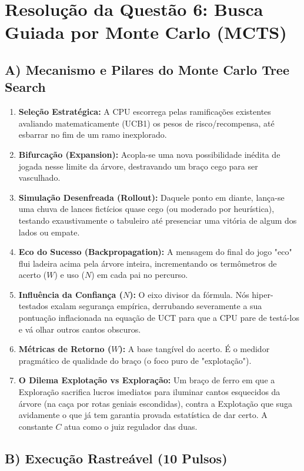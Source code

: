 \section*{Resolução da Questão 6: Busca Guiada por Monte Carlo (MCTS)}

\subsection*{A) Mecanismo e Pilares do Monte Carlo Tree Search}

\begin{enumerate}[label=\alph*)]
    \item \textbf{Seleção Estratégica:} A CPU escorrega pelas ramificações existentes avaliando matematicamente (UCB1) os pesos de risco/recompensa, até esbarrar no fim de um ramo inexplorado.
    \item \textbf{Bifurcação (Expansion):} Acopla-se uma nova possibilidade inédita de jogada nesse limite da árvore, destravando um braço cego para ser vasculhado.
    \item \textbf{Simulação Desenfreada (Rollout):} Daquele ponto em diante, lança-se uma chuva de lances fictícios quase cego (ou moderado por heurística), testando exaustivamente o tabuleiro até presenciar uma vitória de algum dos lados ou empate.
    \item \textbf{Eco do Sucesso (Backpropagation):} A mensagem do final do jogo "eco" flui ladeira acima pela árvore inteira, incrementando os termômetros de acerto ($W$) e uso ($N$) em cada pai no percurso.
    \item \textbf{Influência da Confiança ($N$):} O eixo divisor da fórmula. Nós hiper-testados exalam segurança empírica, derrubando severamente a sua pontuação inflacionada na equação de UCT para que a CPU pare de testá-los e vá olhar outros cantos obscuros.
    \item \textbf{Métricas de Retorno ($W$):} A base tangível do acerto. É o medidor pragmático de qualidade do braço (o foco puro de "explotação").
    \item \textbf{O Dilema Explotação vs Exploração:} Um braço de ferro em que a Exploração sacrifica lucros imediatos para iluminar cantos esquecidos da árvore (na caça por rotas geniais escondidas), contra a Explotação que suga avidamente o que já tem garantia provada estatística de dar certo. A constante $C$ atua como o juiz regulador das duas.
\end{enumerate}

\subsection*{B) Execução Rastreável (10 Pulsos)}

